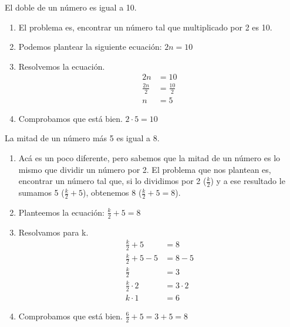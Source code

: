 \documentclass{article}
\begin{document}
\begin{ejemplo}
El doble de un número es igual a 10.

\begin{enumerate}
	\item El problema es, encontrar un número tal que multiplicado por 2 es 10.
	\item Podemos plantear la siguiente ecuación: $2n=10$
	\item Resolvemos la ecuación.
		\begin{align}
		2n&=10\nonumber\\
		\frac{2n}{2}&=\frac{10}{2}\nonumber\\
		n&=5\nonumber
		\end{align}
	\item Comprobamos que está bien. $2\cdot5=10$
\end{enumerate}

\end{ejemplo}

\begin{ejemplo}
La mitad de un número más 5 es igual a 8.

\begin{enumerate}
	\item Acá es un poco diferente, pero sabemos que la mitad de un número es lo mismo que dividir un número por 2. El problema que nos plantean es, encontrar un número tal que, si lo dividimos por 2 ($\frac{k}{2}$) y a ese resultado le sumamos 5 ($\frac{k}{2}+5$), obtenemos 8 ($\frac{k}{2}+5=8$).
	\item Planteemos la ecuación: $\frac{k}{2}+5=8$
	\item Resolvamos para k.
	\begin{align}
	\frac{k}{2}+5&=8\nonumber\\
	\frac{k}{2}+5-5&=8-5\nonumber\\
	\frac{k}{2}&=3\nonumber\\
	\frac{k}{2}\cdot2&=3\cdot2\nonumber\\
	k\cdot1&=6\nonumber
	\end{align}
	\item Comprobamos que está bien. $\frac{6}{2}+5=3+5=8$
\end{enumerate}

\end{ejemplo}
\end{document}
